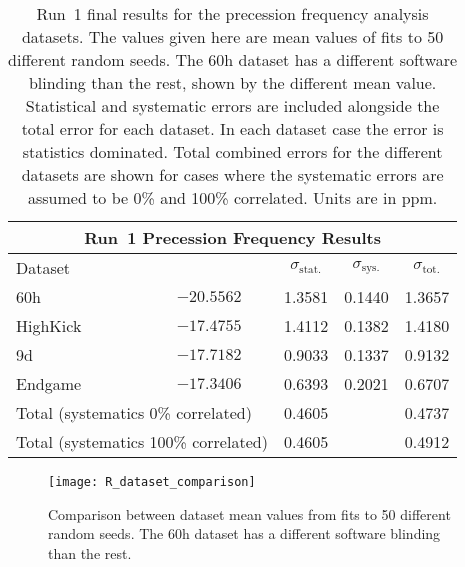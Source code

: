 \begin{table}
\centering
\renewcommand{\arraystretch}{1.2}
\begin{tabular*}{\linewidth}{@{\extracolsep{\fill}}lcccc}
  \hline
    \multicolumn{5}{c}{\textbf{Run~1 Precession Frequency Results}} \\
  \hline\hline
    Dataset & \multicolumn{1}{c}{\R} & \multicolumn{1}{c}{$\sigma_{\text{stat.}}$} & \multicolumn{1}{c}{$\sigma_{\text{sys.}}$} & \multicolumn{1}{c}{$\sigma_{\text{tot.}}$} \\ 
  \hline
    60h & $-20.5562$ & 1.3581 & 0.1440 & 1.3657 \\
    HighKick & $-17.4755$ & 1.4112 & 0.1382 & 1.4180 \\
    9d & $-17.7182$ & 0.9033 & 0.1337 & 0.9132 \\
    Endgame & $-17.3406$ & 0.6393 & 0.2021 & 0.6707 \\
  \hline
  \multicolumn{2}{l}{Total (systematics 0\% correlated)} & 0.4605 & & 0.4737 \\
  \multicolumn{2}{l}{Total (systematics 100\% correlated)} & 0.4605 & & 0.4912 \\
  \hline
\end{tabular*}
\caption[Run~1 final results]{Run~1 final results for the precession frequency analysis datasets. The \R values given here are mean values of fits to 50 different random seeds. The 60h dataset has a different software blinding than the rest, shown by the different mean \R value. Statistical and systematic errors are included alongside the total error for each dataset. In each dataset case the error is statistics dominated. Total combined errors for the different datasets are shown for cases where the systematic errors are assumed to be 0\% and 100\% correlated. Units are in ppm.}
\label{tab:FinalResults}
\end{table}



\begin{figure}
    \centering
    \texttt{[image: R\_dataset\_comparison]}
    \caption[Comparison between dataset mean \R values]{Comparison between dataset mean \R values from fits to 50 different random seeds. The 60h dataset has a different software blinding than the rest.}
    \label{fig:RComparison}
\end{figure}







